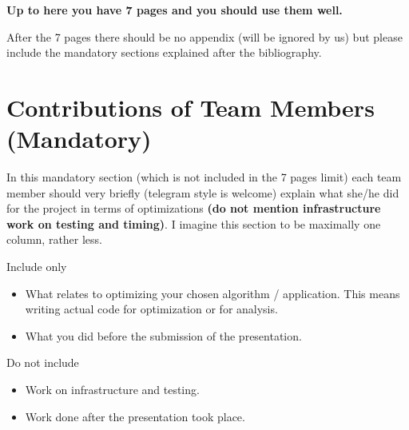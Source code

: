 \documentclass[letterpaper]{article}
\newcommand{\mypar}[1]{{\bf #1.}}
\begin{document}




\bigskip
{\bf Up to here you have 7 pages and you should use them well.}

\bigskip
After the 7 pages there should be no appendix (will be ignored by us) but please include the mandatory sections explained after the bibliography.




\section{Contributions of Team Members (Mandatory)}

In this mandatory section (which is not included in the 7 pages limit) each team member should very briefly (telegram style is welcome) explain what she/he did for the project in terms of optimizations {\bf (do not mention  infrastructure work on testing and timing)}. I imagine this section to be maximally one column, rather less. 

Include only 
\begin{itemize}
	\item What relates to optimizing your chosen algorithm / application. This means writing actual code for optimization or for analysis.
	\item What you did before the submission of the presentation.
\end{itemize}
Do not include
\begin{itemize}
	\item Work on infrastructure and testing.
	\item Work done after the presentation took place.
\end{itemize}
\end{document}
